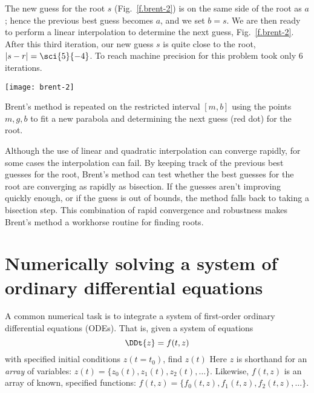 The new guess for the root $s$ (Fig.~\ref{f.brent-2}) is on the same side of the root as $a$; hence the previous best guess becomes $a$, and we set $b = s$. We are then ready to perform a linear interpolation to determine the next guess, Fig.~\ref{f.brent-2}. After this third iteration, our new guess $s$ is quite close to the root, $|s-r| = \sci{5}{-4}$. To reach machine precision for this problem took only 6 iterations.
\begin{marginfigure}
\texttt{[image: brent-2]}
\caption[Third iteration, Brent's method]{Brent's method is repeated on the restricted interval $[m,b]$ using the points $m,g,b$ to fit a new parabola and determining the next guess (red dot) for the root.\label{f.brent-2}}
\end{marginfigure}

Although the use of linear and quadratic interpolation can converge rapidly, for some cases the interpolation can fail. By keeping track of the previous best guesses for the root, Brent's method can test whether the best guesses for the root are converging as rapidly as bisection. If the guesses aren't improving quickly enough, or if the guess is out of bounds, the method falls back to taking a bisection step. This combination of rapid convergence and robustness makes Brent's method a workhorse routine for finding roots.

\section[Solving a system of ordinary differential equations]{Numerically solving a system of ordinary differential equations}
A common numerical task is to integrate a system of first-order ordinary differential equations (ODEs). That is, given a system of equations
\begin{equation}\label{e.equation}
\DDt{z} = f(t,z)
\end{equation}
with specified initial conditions $z(t=t_{0})$, find $z(t)$
Here $z$ is shorthand for an \emph{array} of variables: $z(t) = \{ z_{0}(t), z_{1}(t), z_{2}(t), \ldots\}$. Likewise, $f(t,z)$ is an array of known, specified functions: $f(t,z) = \{f_{0}(t,z), f_{1}(t,z), f_{2}(t,z), \ldots\}$.

